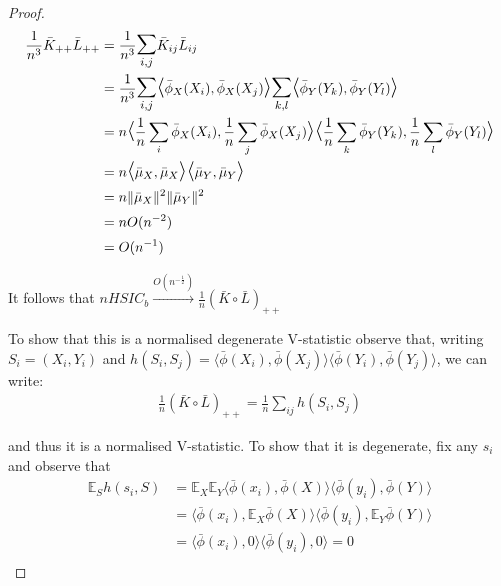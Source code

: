 \documentclass[]{article}
\begin{document}
\begin{proof}
\begin{align*}
 \frac{1}{n^3}\bar{K}_{++}\bar{L}_{++} &= \frac{1}{n^3}\mathlarger{\mathlarger{\sum}}_{i,j}\bar{K}_{ij}\bar{L}_{ij}\\
 & =  \frac{1}{n^3}\mathlarger{\mathlarger{\sum}}_{i,j}\mathlarger{\mathlarger{\langle}} \bar{\phi}_X(X_i), \bar{\phi}_X(X_j) \mathlarger{\mathlarger{\rangle}} \mathlarger{\mathlarger{\sum}}_{k,l}\mathlarger{\mathlarger{\langle}} \bar{\phi}_Y(Y_k), \bar{\phi}_Y(Y_l) \mathlarger{\mathlarger{\rangle}} \\ &
 = n\mathlarger{\mathlarger{\langle}} \frac{1}{n}\sum_i\bar{\phi}_X(X_i) , \frac{1}{n}\sum_j\bar{\phi}_X(X_j) \mathlarger{\mathlarger{\rangle}} \mathlarger{\mathlarger{\langle}} \frac{1}{n}\sum_k\bar{\phi}_Y(Y_k)  , \frac{1}{n}\sum_l\bar{\phi}_Y(Y_l) \mathlarger{\mathlarger{\rangle}}\\&
 = n \mathlarger{\mathlarger{\langle}} \bar{\mu}_X , \bar{\mu}_X \mathlarger{\mathlarger{\rangle}} \mathlarger{\mathlarger{\langle}} \bar{\mu}_Y , \bar{\mu}_Y  \mathlarger{\mathlarger{\rangle}} \\ &
= n\|\bar{\mu}_X \|^2 \|\bar{\mu}_Y \|^2\\ &= nO(n^{-2}) \\&= O(n^{-1})
\end{align*}


It follows that $nHSIC_b  \xrightarrow{O(n^{-\frac{1}{2}})} \frac{1}{n} (\bar{K}\circ \bar{L})_{++}$

To show that this is a normalised degenerate V-statistic observe that, writing $S_i=(X_i,Y_i)$ and $h(S_i,S_j) = \langle\bar{\phi}(X_i),\bar{\phi}(X_j)\rangle \langle\bar{\phi}(Y_i),\bar{\phi}(Y_j)\rangle$, we can write:
\begin{align*}
 \frac{1}{n} (\bar{K}\circ \bar{L})_{++}= \frac{1}{n}\sum_{ij} h(S_i,S_j)
\end{align*}

and thus it is a normalised V-statistic. To show that it is degenerate, fix any $s_i$ and observe that 
\begin{align*}
\mathbb{E}_{S}h(s_i,S) &= \mathbb{E}_X\mathbb{E}_Y \langle\bar{\phi}(x_i),\bar{\phi}(X)\rangle \langle\bar{\phi}(y_i),\bar{\phi}(Y)\rangle \\
&= \langle\bar{\phi}(x_i),\mathbb{E}_X\bar{\phi}(X)\rangle \langle\bar{\phi}(y_i),\mathbb{E}_Y\bar{\phi}(Y)\rangle \\
&= \langle\bar{\phi}(x_i),0\rangle \langle\bar{\phi}(y_i),0\rangle = 0\\
\end{align*}	
\end{proof}
\end{document}
